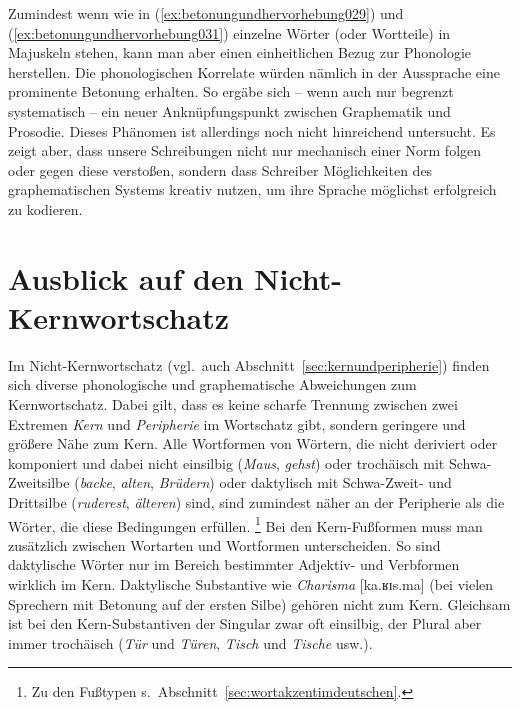 Zumindest wenn wie in (\ref{ex:betonungundhervorhebung029}) und (\ref{ex:betonungundhervorhebung031}) einzelne Wörter (oder Wortteile) in Majuskeln stehen, kann man aber einen einheitlichen Bezug zur Phonologie herstellen.
Die phonologischen Korrelate würden nämlich in der Aussprache eine prominente Betonung erhalten.
So ergäbe sich -- wenn auch nur begrenzt systematisch -- ein neuer Anknüpfungspunkt zwischen Graphematik und Prosodie.
Dieses Phänomen ist allerdings noch nicht hinreichend untersucht.
Es zeigt aber, dass unsere Schreibungen nicht nur mechanisch einer Norm folgen oder gegen diese verstoßen, sondern dass Schreiber Möglichkeiten des graphematischen Systems kreativ nutzen, um ihre Sprache möglichst erfolgreich zu kodieren.


\section{Ausblick auf den Nicht-Kernwortschatz}
\label{sec:ausblickaufdennichtkernwortschatz}


Im Nicht-Kernwortschatz (vgl.\ auch Abschnitt~\ref{sec:kernundperipherie}) finden sich diverse phonologische und graphematische Abweichungen zum Kernwortschatz.
Dabei gilt, dass es keine scharfe Trennung zwischen zwei Extremen \textit{Kern} und \textit{Peripherie} im Wortschatz gibt, sondern geringere und größere Nähe zum Kern.
Alle Wortformen von Wörtern, die nicht deriviert oder komponiert und dabei nicht einsilbig (\textit{Maus}, \textit{gehst}) oder trochäisch mit Schwa-Zweitsilbe (\textit{backe}, \textit{alten}, \textit{Brüdern}) oder daktylisch mit Schwa-Zweit- und Drittsilbe (\textit{ruderest}, \textit{älteren}) sind, sind zumindest näher an der Peripherie als die Wörter, die diese Bedingungen erfüllen.%
\footnote{Zu den Fußtypen s.\ Abschnitt~\ref{sec:wortakzentimdeutschen}.}
Bei den Kern-Fußformen muss man zusätzlich zwischen Wortarten und Wortformen unterscheiden.
So sind \zB daktylische Wörter nur im Bereich bestimmter Adjektiv- und Verbformen wirklich im Kern.
Daktylische Substantive wie \textit{Charisma} [ka.ʁɪs.ma] (bei vielen Sprechern mit Betonung auf der ersten Silbe) gehören nicht zum Kern.
Gleichsam ist bei den Kern-Substantiven der Singular zwar oft einsilbig, der Plural aber immer trochäisch (\textit{Tür} und \textit{Türen}, \textit{Tisch} und \textit{Tische} usw.).

